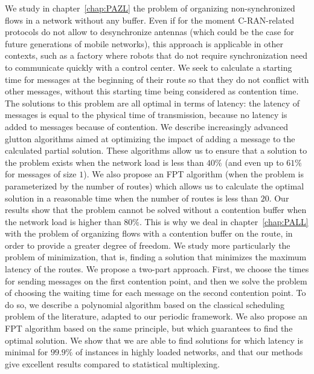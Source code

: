We study in chapter~\ref{chap:PAZL} the problem of organizing non-synchronized flows in a network without any buffer.
Even if for the moment C-RAN-related protocols do not allow to desynchronize antennas (which could be the case for future generations of mobile networks), this approach is applicable in other contexts, such as a factory where robots that do not require synchronization need to communicate quickly with a control center.
We seek to calculate a starting time for messages at the beginning of their route so that they do not conflict with other messages, without this starting time being considered as contention time.
The solutions to this problem are all optimal in terms of latency: the latency of messages is equal to the physical time of transmission, because no latency is added to messages because of contention. We describe increasingly advanced glutton algorithms aimed at optimizing the impact of adding a message to the calculated partial solution. These algorithms allow us to ensure that a solution to the problem exists when the network load is less than $40\%$ (and even up to $61\%$ for messages of size $1$). We also propose an FPT algorithm (when the problem is parameterized by the number of routes) which allows us to calculate the optimal solution in a reasonable time when the number of routes is less than $20$. Our results show that the problem cannot be solved without a contention buffer when the network load is higher than $80\%$.
This is why we deal in chapter~\ref{chap:PALL} with the problem of organizing flows with a contention buffer on the route, in order to provide a greater degree of freedom. We study more particularly the problem of minimization, that is, finding a solution that minimizes the maximum latency of the routes. We propose a two-part approach. First, we choose the times for sending messages on the first contention point, and then we solve the problem of choosing the waiting time for each message on the second contention point. To do so, we describe a polynomial algorithm based on the classical scheduling problem of the literature, adapted to our periodic framework. We also propose an FPT algorithm based on the same principle, but which guarantees to find the optimal solution. We show that we are able to find solutions for which latency is minimal for $99.9\%$ of instances in highly loaded networks, and that our methods give excellent results compared to statistical multiplexing.

